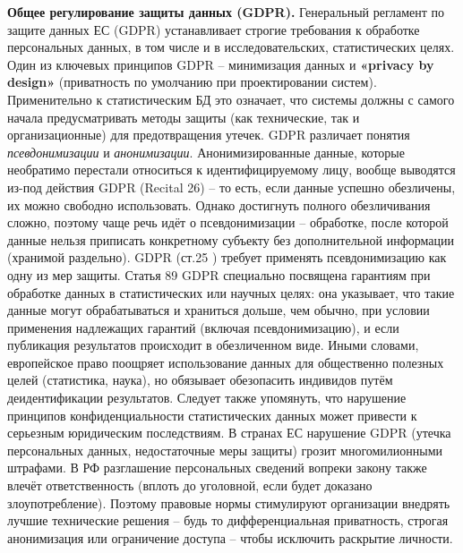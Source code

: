 \textbf{Общее регулирование защиты данных (GDPR).}
Генеральный регламент по защите данных ЕС (GDPR) устанавливает строгие требования к обработке персональных данных, в том
числе и в исследовательских, статистических целях. Один из ключевых принципов GDPR – минимизация данных и
\textbf{«privacy by design»} (приватность по умолчанию при проектировании систем). Применительно к статистическим БД это
означает, что системы должны с самого начала предусматривать методы защиты (как технические, так и организационные) для
предотвращения утечек. GDPR различает понятия \textit{псевдонимизации} и \textit{анонимизации}. Анонимизированные
данные, которые необратимо перестали относиться к идентифицируемому лицу, вообще выводятся из-под действия GDPR (Recital
26) – то есть, если данные успешно обезличены, их можно свободно использовать. Однако достигнуть полного обезличивания
сложно, поэтому чаще речь идёт о псевдонимизации – обработке, после которой данные нельзя приписать конкретному субъекту
без дополнительной информации (хранимой раздельно). GDPR (ст.25 \autocite{GDPR25}) требует применять псевдонимизацию как
одну из мер защиты. Статья 89 GDPR \autocite{GDPR89} специально посвящена гарантиям при обработке данных в
статистических или научных целях: она указывает, что такие данные могут обрабатываться и храниться дольше, чем обычно,
при условии применения надлежащих гарантий (включая псевдонимизацию), и если публикация результатов происходит в
обезличенном виде. Иными словами, европейское право поощряет использование данных для общественно полезных целей
(статистика, наука), но обязывает обезопасить индивидов путём деидентификации результатов. Следует также упомянуть, что
нарушение принципов конфиденциальности статистических данных может привести к серьезным юридическим последствиям. В
странах ЕС нарушение GDPR (утечка персональных данных, недостаточные меры защиты) грозит многомилионными штрафами. В РФ
разглашение персональных сведений вопреки закону также влечёт ответственность (вплоть до уголовной, если будет доказано
злоупотребление). Поэтому правовые нормы стимулируют организации внедрять лучшие технические решения – будь то
дифференциальная приватность, строгая анонимизация или ограничение доступа – чтобы исключить раскрытие личности.

